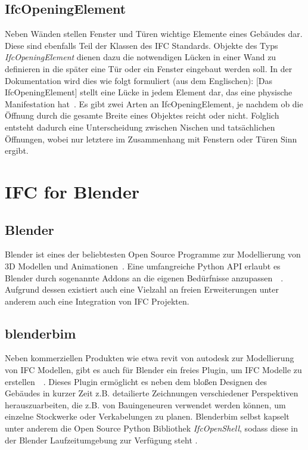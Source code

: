 \subsection{IfcOpeningElement}\label{basics:IfcOpeningElement}
Neben Wänden stellen Fenster und Türen wichtige Elemente eines Gebäudes dar.
Diese sind ebenfalls Teil der Klassen des IFC Standards.
Objekte des Typs \textit{IfcOpeningElement} dienen dazu die notwendigen Lücken in einer Wand zu definieren in die später eine Tür oder ein Fenster eingebaut werden soll.
In der Dokumentation wird dies wie folgt formuliert (aus dem Englischen): \glqq{}[Das IfcOpeningElement] stellt eine Lücke in jedem Element dar, das eine physische Manifestation hat\grqq{}~\cite{IFC4310OpeningElement:online}.
Es gibt zwei Arten an IfcOpeningElement, je nachdem ob die Öffnung durch die gesamte Breite eines Objektes reicht oder nicht. 
Folglich entsteht dadurch eine Unterscheidung zwischen Nischen und tatsächlichen Öffnungen, wobei nur letztere im Zusammenhang mit Fenstern oder Türen Sinn ergibt.

\section{IFC for Blender}\label{basics:blender}
\subsection{Blender}
Blender ist eines der beliebtesten Open Source Programme zur Modellierung von 3D Modellen und Animationen~\cite{blendero56:online}.
Eine umfangreiche Python API erlaubt es Blender durch sogenannte Addons an die eigenen Bedürfnisse anzupassen~\cite{PythonWebsite:online}~\cite{BlenderPythonAPI:online}.
Aufgrund dessen existiert auch eine Vielzahl an freien Erweiterungen \textendash{} unter anderem auch eine Integration von IFC Projekten.

\subsection{blenderbim}\label{basics:blenderbim}
Neben kommerziellen Produkten wie etwa revit von autodesk zur Modellierung von IFC Modellen, gibt es auch für Blender ein freies Plugin, um IFC Modelle zu erstellen~\cite{RevitSof26:online}~\cite{BlenderB43:online}.
Dieses Plugin ermöglicht es neben dem bloßen Designen des Gebäudes in kurzer Zeit z.B. detailierte Zeichnungen verschiedener Perspektiven herauszuarbeiten, die z.B. von Bauingeneuren verwendet werden können, um einzelne Stockwerke oder Verkabelungen zu planen.
Blenderbim selbst kapselt unter anderem die Open Source Python Bibliothek \textit{IfcOpenShell}, sodass diese in der Blender Laufzeitumgebung zur Verfügung steht \cite{IFCOpenShell:online}.

